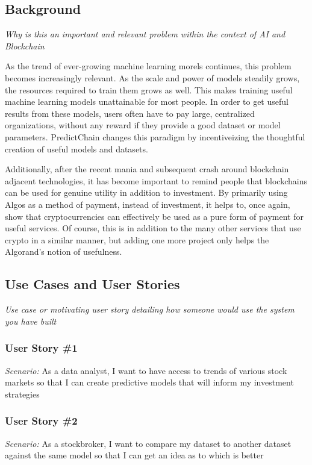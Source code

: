 \documentclass{article}
\begin{document}
    \subsection{Background}
    \emph{Why is this an important and relevant problem within the context of AI and Blockchain}

    As the trend of ever-growing machine learning morels continues, this problem becomes increasingly relevant.
    As the scale and power of models steadily grows, the resources required to train them grows as well.  This makes training
    useful machine learning models unattainable for most people.  In order to get useful results from these models,
    users often have to pay large, centralized organizations, without any reward if they provide a good dataset or model
    parameters.  PredictChain changes this paradigm by incentiveizing the thoughtful creation of useful models and
    datasets.

    Additionally, after the recent mania and subsequent crash around blockchain adjacent technologies, it has become
    important to remind people that blockchains can be used for genuine utility in addition to investment.  By primarily
    using Algos as a method of payment, instead of investment, it helps to, once again, show that cryptocurrencies can
    effectively be used as a pure form of payment for useful services.  Of course, this is in addition to the many other
    services that use crypto in a similar manner, but adding one more project only helps the Algorand's notion of usefulness.


    \subsection{Use Cases and User Stories}
    \emph{Use case or motivating user story detailing how someone would use the system you have built}

    \subsubsection*{User Story \#1}
    \textit{Scenario:} As a data analyst, I want to have access to trends of various stock markets so that I can create
    predictive models that will inform my investment strategies

    \subsubsection*{User Story \#2}
    \textit{Scenario:} As a stockbroker, I want to compare my dataset to another dataset against the same model so that
    I can get an idea as to which is better
\end{document}
